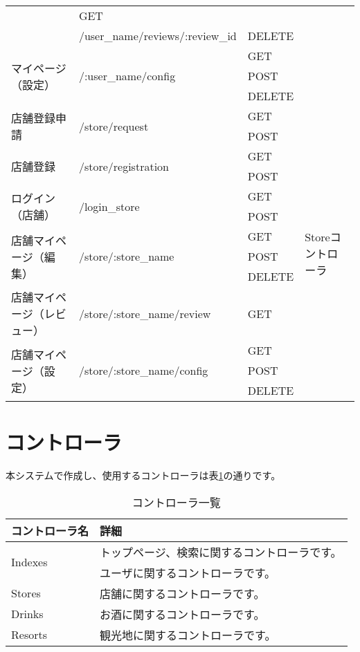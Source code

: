 \documentclass[a4j,titlepage]{jarticle}
\begin{document}
\begin{description}
\begin{table}[!htbp]
\begin{center}
\begin{tabular}{|l|l|l|p{4cm}|}
& GET & \\\cline{2-3}
 & /user\_name/reviews/:review\_id & DELETE & \\\cline{1-3}
\multirow{3}{*}{マイページ（設定）} & \multirow{3}{*}{/:user\_name/config}
& GET & \\\cline{3-3}
 & & POST & \\\cline{3-3}
 & & DELETE & \\\hline
 \multirow{2}{*}{店舗登録申請} & \multirow{2}{*}{/store/request}
 & GET & \multirow{13}{*}{Storeコントローラ} \\\cline{3-3}
  & & POST &\\\cline{1-3}
 \multirow{2}{*}{店舗登録} & \multirow{2}{*}{/store/registration}
 & GET &\\\cline{3-3}
  & & POST &\\\cline{1-3}
 \multirow{2}{*}{ログイン（店舗）} & \multirow{2}{*}{/login\_store}
 & GET & \\\cline{3-3}
  & & POST & \\\cline{1-3}
\multirow{3}{*}{店舗マイページ（編集）}& \multirow{3}{*}{/store/:store\_name}
& GET & \\\cline{3-3}
 & & POST & \\\cline{3-3}
 & & DELETE & \\\cline{1-3}
店舗マイページ（レビュー） & /store/:store\_name/review
& GET & \\\cline{1-3}
\multirow{3}{*}{店舗マイページ（設定）} & \multirow{3}{*}{/store/:store\_name/config}
& GET & \\\cline{3-3}
 & & POST & \\\cline{3-3}
 & & DELETE & \\\hline
\end{tabular}
\end{center}
\end{table}

\section{コントローラ}
本システムで作成し、使用するコントローラは表\ref{controller}の通りです。

\begin{table}[!htbp]
\caption{コントローラ一覧}
\label{controller}
\small
\begin{center}
\begin{tabular}{|l|p{5cm}|}\hline
コントローラ名 & 詳細 \\\hline\hline
\multirow{2}{*}{Indexes} & トップページ、検索に関するコントローラです。 \\\hline
Users & ユーザに関するコントローラです。 \\\hline
Stores & 店舗に関するコントローラです。 \\\hline
Drinks & お酒に関するコントローラです。 \\\hline
Resorts & 観光地に関するコントローラです。 \\\hline
\end{tabular}
\end{center}
\end{table}


\end{description}
\end{document}
